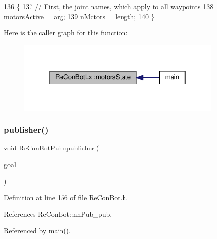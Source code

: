 \begin{DoxyCode}
136                                                   \{
137   \textcolor{comment}{// First, the joint names, which apply to all waypoints}
138   \hyperlink{_re_con_bot_8h_a754c7486afa85fff30b8e7c0ce40c264}{motorsActive} = arg;
139   \hyperlink{_re_con_bot_8h_af9fc8046227b67fb8c85827f5ebc4838}{nMotors} = length;
140 \}
\end{DoxyCode}
Here is the caller graph for this function\+:
\nopagebreak
\begin{figure}[H]
\begin{center}
\leavevmode
\includegraphics[width=286pt]{d2/d07/class_re_con_bot_lx_a0e25f573057755c6729ea572362652e6_icgraph}
\end{center}
\end{figure}
\mbox{\label{class_re_con_bot_pub_ac763949cb5256de695e02c5f81084ead}} 
\subsubsection{\texorpdfstring{publisher()}{publisher()}}
{\footnotesize\ttfamily void Re\+Con\+Bot\+Pub\+::publisher (\begin{DoxyParamCaption}\item[{control\+\_\+msgs\+::\+Follow\+Joint\+Trajectory\+Goal}]{goal }\end{DoxyParamCaption})}



Definition at line 156 of file Re\+Con\+Bot.\+h.



References Re\+Con\+Bot\+::nh\+Pub\+\_\+pub.



Referenced by main().



